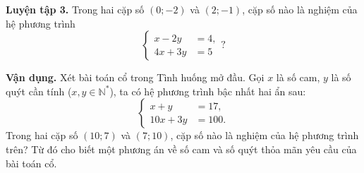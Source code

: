 \begin{lesson}
    \textbf{Luyện tập 3.} Trong hai cặp số $(0;-2)$ và $(2;-1)$, cặp số nào là nghiệm của hệ phương trình
    \[
        \left\{
        \begin{aligned}
            x-2y&=4,\\
            4x+3y&=5
        \end{aligned}
        \right. ?
    \]

    \answerline
    \answerline

    \textbf{Vận dụng.} Xét bài toán cổ trong Tình huống mở đầu. Gọi $x$ là số cam, $y$ là số quýt cần tính ($x,y\in\mathbb{N}^{*}$), ta có hệ phương trình bậc nhất hai ẩn sau:
    \[
        \left\{
        \begin{aligned}
            x+y&=17,\\
            10x+3y&=100.
        \end{aligned}
        \right.
    \]
    Trong hai cặp số $(10;7)$ và $(7;10)$, cặp số nào là nghiệm của hệ phương trình trên? Từ đó cho biết một phương án về số cam và số quýt thỏa mãn yêu cầu của bài toán cổ.

    \answerline
    \answerline
\end{lesson}

